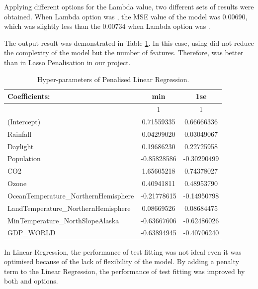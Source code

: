 Applying different options for the Lambda value, two different sets of results were obtained. When Lambda option was , the MSE value of the model was 0.00690, which was slightly less than the 0.00734 when Lambda option was . 

The output result was demonstrated in Table \ref{4.2.2-PLR-para}. In this case, using  did not reduce the complexity of the model but the number of features. Therefore,  was better than  in Lasso Penalisation in our project.

\begin{table}[htbp]
  \centering
  \footnotesize
  \begin{tabular}{p{5.75cm} | c | c}
  \toprule
  Coefficients: & min & 1se\\ %
  \hline
    & 1 & 1\\
  (Intercept) & 0.71559335 & 0.66666336\\
  Rainfall & 0.04299020 & 0.03049067\\
  Daylight & 0.19686230 & 0.22725958\\
  Population & -0.85828586 & -0.30290499\\
  CO2 & 1.65605218 & 0.74378027\\
  Ozone & 0.40941811 & 0.48953790\\
  OceanTemperature\_NorthernHemisphere & -0.21778615 & -0.14950798\\
  LandTemperature\_NorthernHemisphere & 0.08669526 & 0.08684475\\
  MinTemperature\_NorthSlopeAlaska & -0.63667606 & -0.62486026\\
  GDP\_WORLD & -0.63894945 & -0.40706240\\
  \bottomrule
  \end{tabular}
  \caption{Hyper-parameters of Penalised Linear Regression.}
  \label{4.2.2-PLR-para}
\end{table}


In Linear Regression, the performance of test fitting was not ideal even it was optimised because of the lack of flexibility of the model. By adding a penalty term to the Linear Regression, the performance of test fitting was improved by both  and  options. 


